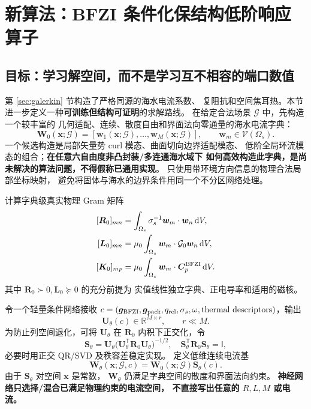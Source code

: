 \section{新算法：BFZI 条件化保结构低阶响应算子}\label{sec:neural-rom}
\subsection{目标：学习解空间，而不是学习互不相容的端口数值}
第 \ref{sec:galerkin} 节构造了严格同源的海水电流系数、
复阻抗和空间焦耳热。本节进一步定义一种\textbf{可训练但结构可证明}的求解路线。
在给定合法场景 \(\mathcal G\) 中，先构造一个较丰富的
几何适配、连续、散度自由和界面法向零通量的海水电流字典：
\[
\bm W_0(\bm x;\mathcal G)
=[\bm w_1(\bm x;\mathcal G),\ldots,\bm w_M(\bm x;\mathcal G)],
\qquad \bm w_m\in\mathcal V(\Omega_s).
\]
一个候选构造是局部矢量势 curl 模态、曲面切向边界适配模态、
低阶全局环流模态的组合；\textbf{在任意六自由度非凸封装/多连通海水域下
如何高效构造此字典，是尚未解决的算法问题，不得假称已通用实现}。
只使用带环境方向信息的物理合法局部坐标映射，
避免将固体与海水的边界条件用同一个不分区网络处理。

计算字典级真实物理 Gram 矩阵
\[
\begin{aligned}
[\bm R_0]_{mn}&=\int_{\Omega_s}\sigma_s^{-1}\bm w_m\cdot\bm w_n\,\mathrm dV,\\
[\bm L_0]_{mn}&=\mu_0\int_{\Omega_s}\bm w_m\cdot\mathcal G_0\bm w_n\,\mathrm dV,\\
[\bm K_0]_{mp}&=\mu_0\int_{\Omega_s}\bm w_m\cdot\bm C_p^{\rm BFZI}\,\mathrm dV.
\end{aligned}
\]
其中 \(\bm R_0\succ0,\bm L_0\succeq0\) 的充分前提为
实值线性独立字典、正电导率和适用的磁核。

令一个轻量条件网络接收
\(c=(\bm g_{\rm BFZI},\bm g_{\rm pack},q_{\rm rel},
\sigma_s,\omega,\text{thermal descriptors})\)，输出
\begin{equation}
\boxed{\bm U_\theta(c)\in\mathbb R^{M\times r},\qquad r\ll M.}
\label{eq:learned-subspace}
\end{equation}
为防止列空间退化，可将 \(\bm U_\theta\)
在 \(\bm R_0\) 内积下正交化，令
\[
\bm S_\theta=
\bm U_\theta
\bigl(\bm U_\theta^{\mathsf T}\bm R_0\bm U_\theta\bigr)^{-1/2},
\quad
\bm S_\theta^{\mathsf T}\bm R_0\bm S_\theta=\mathsf I,
\]
必要时用正交 QR/SVD 及秩容差稳定实现。
定义低维连续电流基
\begin{equation}
\boxed{\bm W_\theta(\bm x;\mathcal G,c)
=\bm W_0(\bm x;\mathcal G)\bm S_\theta(c).}
\label{eq:learned-current-basis}
\end{equation}
由于 \(\bm S_\theta\) 对空间 \(\bm x\) 是常数，
\(\bm W_\theta\) 仍满足字典空间的散度和界面法向约束。
\textbf{神经网络只选择/混合已满足物理约束的电流空间，
不直接写出任意的 \(R,L,M\) 或电流。}

